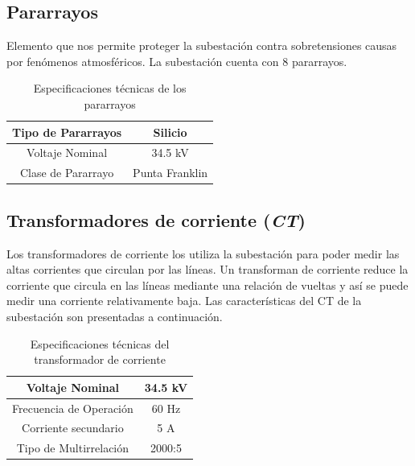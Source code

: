 \documentclass[11pt, Spanish]{article}
\begin{document}
\subsection{Pararrayos}

Elemento que nos permite proteger la subestación contra sobretensiones causas por fenómenos atmosféricos. La subestación cuenta con 8 pararrayos. \\

\begin{table}[h]
  \begin{center}
    \label{tab:table1}
    \begin{tabular}{|c|c|} 
    \hline
      Tipo de Pararrayos & Silicio \\
      \hline
     Voltaje Nominal & 34.5 kV \\ \hline
     Clase de Pararrayo  & Punta Franklin \\ \hline
    \end{tabular}
    \caption{Especificaciones técnicas de los pararrayos}
  \end{center}
\end{table}


\subsection{Transformadores de corriente (\textit{CT})}

Los transformadores de corriente los utiliza la subestación para poder medir las altas corrientes que circulan por las líneas. Un transforman de corriente reduce la corriente que circula en las líneas mediante una relación de vueltas y así se puede medir una corriente relativamente baja. Las características del CT de la subestación son presentadas a continuación.

\begin{table}[h]
  \begin{center}
    \label{tab:table1}
    \begin{tabular}{|c|c|} 
    \hline
      Voltaje Nominal & 34.5 kV \\
      \hline
     Frecuencia de Operación & 60 Hz \\ \hline
     Corriente secundario  & 5 A \\ \hline
     Tipo de Multirrelación  & 2000:5 \\ \hline
    \end{tabular}
    \caption{Especificaciones técnicas del transformador de corriente}
  \end{center}
\end{table}
\end{document}

